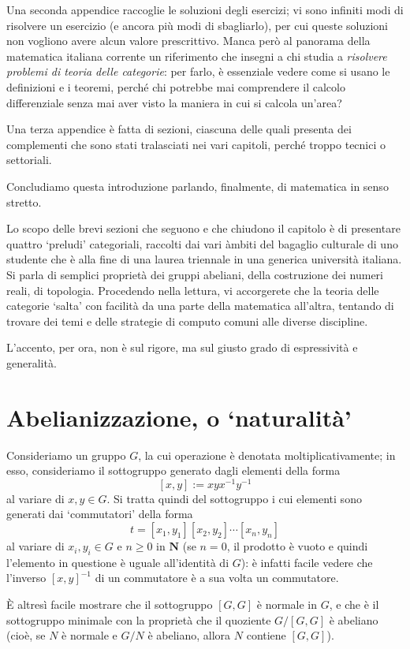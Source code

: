 Una seconda appendice raccoglie le soluzioni degli esercizi; vi sono infiniti modi di risolvere un esercizio (e ancora più modi di sbagliarlo), per cui queste soluzioni non vogliono avere alcun valore prescrittivo. Manca però al panorama della matematica italiana corrente un riferimento che insegni a chi studia a \emph{risolvere problemi di teoria delle categorie}: per farlo, è essenziale vedere come si usano le definizioni e i teoremi, perché chi potrebbe mai comprendere il calcolo differenziale senza mai aver visto la maniera in cui si calcola un'area?

Una terza appendice è fatta di sezioni, ciascuna delle quali presenta dei complementi che sono stati tralasciati nei vari capitoli, perché troppo tecnici o settoriali.\Todo{}

\medskip
Concludiamo questa introduzione parlando, finalmente, di matematica in senso stretto.

Lo scopo delle brevi sezioni che seguono e che chiudono il capitolo è di presentare quattro `preludi' categoriali, raccolti dai vari àmbiti del bagaglio culturale di uno studente che è alla fine di una laurea triennale in una generica università italiana. Si parla di semplici proprietà dei gruppi abeliani, della costruzione dei numeri reali, di topologia. Procedendo nella lettura, vi accorgerete che la teoria delle categorie `salta' con facilità da una parte della matematica all'altra, tentando di trovare dei temi e delle strategie di computo comuni alle diverse discipline.

L'accento, per ora, non è sul rigore, ma sul giusto grado di espressività e generalità.
\section*{Abelianizzazione, o `naturalità'}
Consideriamo un gruppo \(G\), la cui operazione è denotata moltiplicativamente; in esso, consideriamo il sottogruppo generato dagli elementi della forma
\[[x,y]:= xyx^{-1}y^{-1}\]
al variare di \(x,y\in G\). Si tratta quindi del sottogruppo i cui elementi sono generati dai `commutatori' della forma
\[t = [x_1,y_1][x_2,y_2]\cdots[x_n,y_n]\]
al variare di \(x_i,y_i\in G\) e \(n\ge 0\) in \(\mathbf{N}\) (se \(n=0\), il prodotto è vuoto e quindi l'elemento in questione è uguale all'identità di \(G\)): è infatti facile vedere che l'inverso \([x,y]^{-1}\) di un commutatore è a sua volta un commutatore.

\`E altresì facile mostrare che il sottogruppo \([G,G]\) è normale in \(G\), e che è il sottogruppo minimale con la proprietà che il quoziente \(G/[G,G]\) è abeliano (cioè, se \(N\) è normale e \(G/N\) è abeliano, allora \(N\) contiene \([G,G]\)).

